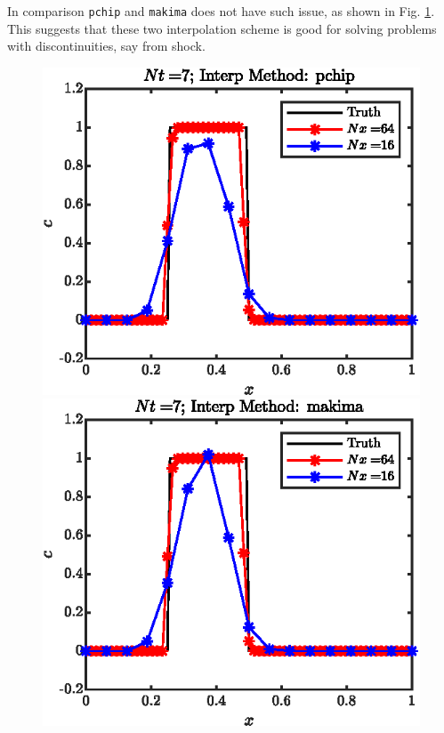 \documentclass[11pt,letterpaper]{article}
\begin{document}
In comparison \texttt{pchip} and \texttt{makima} does not have such issue, as shown in Fig. \ref{fig:1D_step_cons_pchip_sol}. This suggests that these two interpolation scheme is good for solving problems with discontinuities, say from shock. 
\begin{figure}[H]
    \centering
    \includegraphics{figs/1D_step_cons_pchip_sol}
    \includegraphics{figs/1D_step_cons_makima_sol}
    \caption{}\label{fig:1D_step_cons_pchip_sol}
\end{figure}
\end{document}
